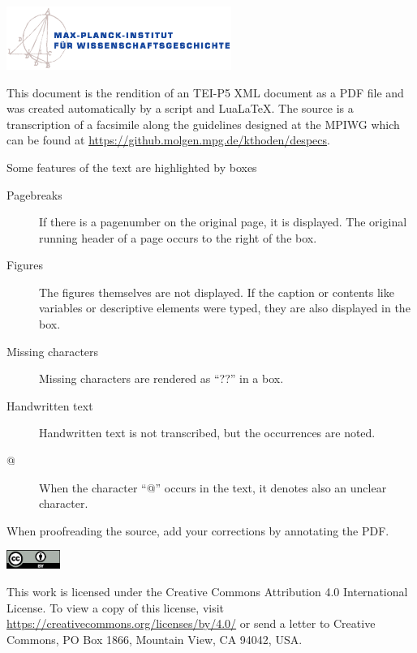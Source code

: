 \thispagestyle{empty}
\noindent\includegraphics[width=0.55\textwidth]{bilder/misc/MPIWG_d_WM_4c.eps}
\vspace{20mm}


\noindent This document is the rendition of an TEI-P5 XML document as
a PDF file and was created automatically by a script and Lua\LaTeX. The source is a
transcription of a facsimile along the guidelines designed at the
MPIWG which can be found at \url{https://github.molgen.mpg.de/kthoden/despecs}.

\noindent Some features of the text are highlighted by boxes
\begin{description}
\item[Pagebreaks] If there is a pagenumber on the original page, it is displayed. The original running header of a page occurs to the right of the box.
\item[Figures] The figures themselves are not displayed. If the caption or contents like variables or descriptive elements were typed, they are also displayed in the box.
\item[Missing characters] Missing characters are rendered as ``??'' in a box.
\item[Handwritten text] Handwritten text is not transcribed, but the occurrences are noted.
\item[@] When the character ``@'' occurs in the text, it denotes also an unclear character.
\end{description}

\noindent When proofreading the source, add your corrections by annotating the PDF.

\vfill

\noindent\includegraphics[width=0.13\textwidth]{bilder/misc/by.eps}

\noindent This work is licensed under the Creative Commons Attribution 4.0 International License. To view a copy of this license, visit \url{https://creativecommons.org/licenses/by/4.0/} or send a letter to Creative Commons, PO Box 1866, Mountain View, CA 94042, USA.

\newpage
